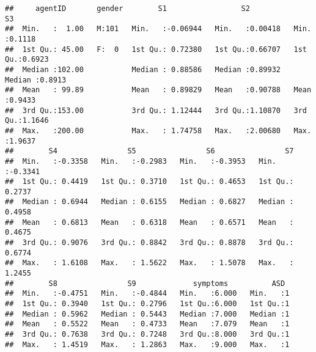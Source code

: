 \documentclass[]{article}
\newenvironment{Shaded}{\begin{snugshade}}{\end{snugshade}}
\newcommand{\KeywordTok}[1]{\textcolor[rgb]{0.13,0.29,0.53}{\textbf{#1}}}
\newcommand{\DecValTok}[1]{\textcolor[rgb]{0.00,0.00,0.81}{#1}}
\newcommand{\StringTok}[1]{\textcolor[rgb]{0.31,0.60,0.02}{#1}}
\newcommand{\CommentTok}[1]{\textcolor[rgb]{0.56,0.35,0.01}{\textit{#1}}}
\newcommand{\OperatorTok}[1]{\textcolor[rgb]{0.81,0.36,0.00}{\textbf{#1}}}
\newcommand{\NormalTok}[1]{#1}
\begin{document}
\begin{Shaded}
\end{Shaded}

\begin{verbatim}
##     agentID       gender        S1                 S2                S3        
##  Min.   :  1.00   M:101   Min.   :-0.06944   Min.   :0.00418   Min.   :0.1118  
##  1st Qu.: 45.00   F:  0   1st Qu.: 0.72380   1st Qu.:0.66707   1st Qu.:0.6923  
##  Median :102.00           Median : 0.88586   Median :0.89932   Median :0.8913  
##  Mean   : 99.89           Mean   : 0.89829   Mean   :0.90788   Mean   :0.9433  
##  3rd Qu.:153.00           3rd Qu.: 1.12444   3rd Qu.:1.10870   3rd Qu.:1.1646  
##  Max.   :200.00           Max.   : 1.74758   Max.   :2.00680   Max.   :1.9637  
##        S4                S5                S6                S7         
##  Min.   :-0.3358   Min.   :-0.2983   Min.   :-0.3953   Min.   :-0.3341  
##  1st Qu.: 0.4419   1st Qu.: 0.3710   1st Qu.: 0.4653   1st Qu.: 0.2737  
##  Median : 0.6944   Median : 0.6155   Median : 0.6827   Median : 0.4958  
##  Mean   : 0.6813   Mean   : 0.6318   Mean   : 0.6571   Mean   : 0.4675  
##  3rd Qu.: 0.9076   3rd Qu.: 0.8842   3rd Qu.: 0.8878   3rd Qu.: 0.6774  
##  Max.   : 1.6108   Max.   : 1.5622   Max.   : 1.5078   Max.   : 1.2455  
##        S8                S9             symptoms          ASD   
##  Min.   :-0.4751   Min.   :-0.4844   Min.   :6.000   Min.   :1  
##  1st Qu.: 0.3940   1st Qu.: 0.2796   1st Qu.:6.000   1st Qu.:1  
##  Median : 0.5962   Median : 0.5443   Median :7.000   Median :1  
##  Mean   : 0.5522   Mean   : 0.4733   Mean   :7.079   Mean   :1  
##  3rd Qu.: 0.7638   3rd Qu.: 0.7248   3rd Qu.:8.000   3rd Qu.:1  
##  Max.   : 1.4519   Max.   : 1.2863   Max.   :9.000   Max.   :1
\end{verbatim}

\begin{Shaded}
\end{Shaded}
\end{document}
